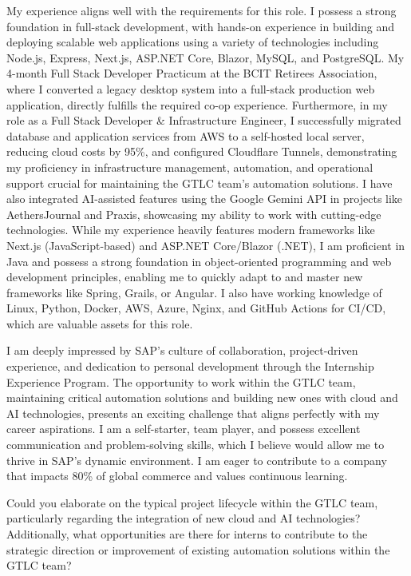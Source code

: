 \documentclass[letterpaper,11pt]{article}
\begin{document}
My experience aligns well with the requirements for this role. I possess a strong foundation in full-stack development, with hands-on experience in building and deploying scalable web applications using a variety of technologies including Node.js, Express, Next.js, ASP.NET Core, Blazor, MySQL, and PostgreSQL. My 4-month Full Stack Developer Practicum at the BCIT Retirees Association, where I converted a legacy desktop system into a full-stack production web application, directly fulfills the required co-op experience. Furthermore, in my role as a Full Stack Developer \& Infrastructure Engineer, I successfully migrated database and application services from AWS to a self-hosted local server, reducing cloud costs by 95\%, and configured Cloudflare Tunnels, demonstrating my proficiency in infrastructure management, automation, and operational support crucial for maintaining the GTLC team's automation solutions. I have also integrated AI-assisted features using the Google Gemini API in projects like AethersJournal and Praxis, showcasing my ability to work with cutting-edge technologies. While my experience heavily features modern frameworks like Next.js (JavaScript-based) and ASP.NET Core/Blazor (.NET), I am proficient in Java and possess a strong foundation in object-oriented programming and web development principles, enabling me to quickly adapt to and master new frameworks like Spring, Grails, or Angular. I also have working knowledge of Linux, Python, Docker, AWS, Azure, Nginx, and GitHub Actions for CI/CD, which are valuable assets for this role.
\vspace{10pt}

I am deeply impressed by SAP's culture of collaboration, project-driven experience, and dedication to personal development through the Internship Experience Program. The opportunity to work within the GTLC team, maintaining critical automation solutions and building new ones with cloud and AI technologies, presents an exciting challenge that aligns perfectly with my career aspirations. I am a self-starter, team player, and possess excellent communication and problem-solving skills, which I believe would allow me to thrive in SAP's dynamic environment. I am eager to contribute to a company that impacts 80\% of global commerce and values continuous learning.

Could you elaborate on the typical project lifecycle within the GTLC team, particularly regarding the integration of new cloud and AI technologies? Additionally, what opportunities are there for interns to contribute to the strategic direction or improvement of existing automation solutions within the GTLC team?
\vspace{10pt}
\end{document}
